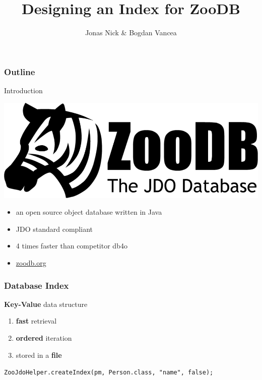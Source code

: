 \documentclass{beamer}
\title{Designing an Index for ZooDB}
\author{Jonas Nick \& Bogdan Vancea}
\begin{document}
  \frame{\titlepage}
  \begin{frame}
    \frametitle{Outline}
    \tableofcontents[hideallsubsections]
  \end{frame}

  \begin{section}{Introduction}
    \begin{frame}
      \vspace{-4em}
      \hspace{-2em}
      \includegraphics[scale=0.1]{images/zoodb_logo.png}
      \vspace{3em}
      \hspace{2em}
      \begin{itemize}
        \item an open source object database written in Java
        \item JDO standard compliant
        \item 4 times faster than competitor db4o
        \item \url{zoodb.org}
      \end{itemize}

    \end{frame}
    \begin{frame}
      \frametitle{Database Index}
      \begin{block}{}
        \textbf{Key-Value} data structure \\
        \begin{enumerate}
        \item \textbf{fast} retrieval 
        \item \textbf{ordered} iteration
        \item stored in a \textbf{file}
        \end{enumerate}
      \end{block}
      \vspace{1em}
      \pause
      \texttt{ZooJdoHelper.createIndex(pm, Person.class, "name", false);}
      \pause
      \begin{center}
      \pause
      \end{center}
    \end{frame}


\end{section}
\end{document}
